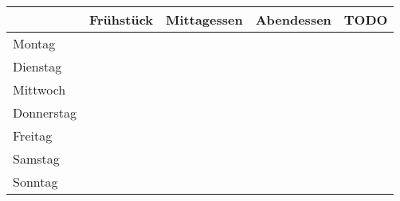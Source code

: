 \documentclass[a4paper,12pt]{article}
\begin{document}
\pagestyle{empty}

\centering
\begin{tabular}{l|p{3cm}|p{3cm}|p{3cm}|p{3cm}}
             & Frühstück & Mittagessen & Abendessen & TODO \\
  \hline 
  Montag     &           &             &                   \\[2.7cm]
  \hline
  Dienstag   &           &             &                   \\[2.7cm]
  \hline
  Mittwoch   &           &             &                   \\[2.7cm]
  \hline
  Donnerstag &           &             &                   \\[2.7cm]
  \hline
  Freitag    &           &             &                   \\[2.7cm]
  \hline
  Samstag    &           &             &                   \\[2.7cm]
  \hline
  Sonntag    &           &             &                   \\[2.7cm]
\end{tabular}
\vfill
\end{document}
